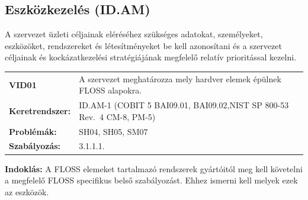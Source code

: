 \documentclass[12pt,magyar,a4paper,oneside]{scrreprt}
\begin{document}
\hypertarget{eszkuxf6zkezeluxe9s-id.am}{%
\subsection{Eszközkezelés (ID.AM)}\label{eszkuxf6zkezeluxe9s-id.am}}

A szervezet üzleti céljainak eléréséhez szükséges adatokat, személyeket,
eszközöket, rendszereket és létesítményeket be kell azonosítani és a
szervezet céljainak és kockázatkezelési stratégiájának megfelelő relatív
prioritással kezelni.

\begin{longtable}[]{@{}ll@{}}
\toprule
\endhead
\begin{minipage}[t]{0.16\columnwidth}\raggedright
\textbf{VID01}\strut
\end{minipage} & \begin{minipage}[t]{0.79\columnwidth}\raggedright
A szervezet meghatározza mely hardver elemek épülnek FLOSS
alapokra.\strut
\end{minipage}\tabularnewline
\begin{minipage}[t]{0.16\columnwidth}\raggedright
\textbf{Keretrendszer:}\strut
\end{minipage} & \begin{minipage}[t]{0.79\columnwidth}\raggedright
ID.AM-1 (COBIT 5 BAI09.01, BAI09.02,NIST SP 800-53 Rev.~4 CM-8,
PM-5)\strut
\end{minipage}\tabularnewline
\begin{minipage}[t]{0.16\columnwidth}\raggedright
\textbf{Problémák:}\strut
\end{minipage} & \begin{minipage}[t]{0.79\columnwidth}\raggedright
SH04, SH05, SM07\strut
\end{minipage}\tabularnewline
\begin{minipage}[t]{0.16\columnwidth}\raggedright
\textbf{Szabályozás:}\strut
\end{minipage} & \begin{minipage}[t]{0.79\columnwidth}\raggedright
3.1.1.1.\strut
\end{minipage}\tabularnewline
\bottomrule
\end{longtable}

\textbf{Indoklás: } A FLOSS elemeket tartalmazó rendszerek gyártóitól
meg kell követelni a megfelelő FLOSS specifikus belső szabályozást.
Ehhez ismerni kell melyek ezek az eszközök.
\end{document}
